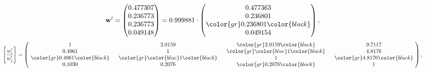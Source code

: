 \begin{example}
\begin{equation*}
\mathbf{w}^{\prime} =
\begin{pmatrix}
0.477307\\
0.236773\\
0.236773\\
0.049148
\end{pmatrix} =
0.999881\cdot
\begin{pmatrix}
0.477363\\
0.236801\\
\color{gr} 0.236801\color{black} \\
0.049154
\end{pmatrix},
\end{equation*}
\begin{equation*}
\left[ \frac{{w}^{\prime}_i}{{w}^{\prime}_j} \right] =
\begin{pmatrix}
$\,\,$ 1 $\,\,$ & $\,\,$2.0159$\,\,$ & $\,\,$\color{gr} 2.0159\color{black} $\,\,$ & $\,\,$9.7117$\,\,$ \\
$\,\,$0.4961$\,\,$ & $\,\,$ 1 $\,\,$ & $\,\,$\color{gr} \color{blue} 1\color{black} $\,\,$ & $\,\,$4.8176  $\,\,$ \\
$\,\,$\color{gr} 0.4961\color{black} $\,\,$ & $\,\,$\color{gr} \color{blue} 1\color{black} $\,\,$ & $\,\,$ 1 $\,\,$ & $\,\,$\color{gr} 4.8176\color{black}  $\,\,$ \\
$\,\,$0.1030$\,\,$ & $\,\,$0.2076$\,\,$ & $\,\,$\color{gr} 0.2076\color{black} $\,\,$ & $\,\,$ 1  $\,\,$ \\
\end{pmatrix},
\end{equation*}
\end{example}
\newpage
